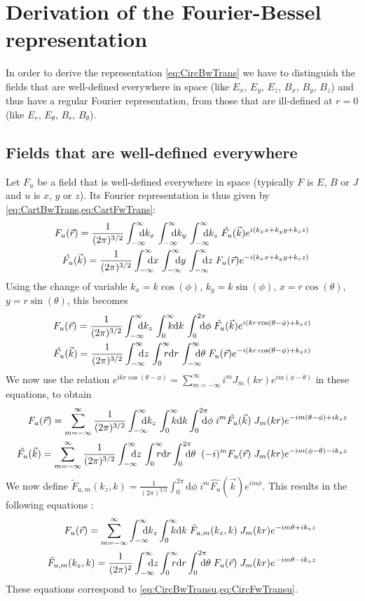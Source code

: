 
\section{Derivation of the Fourier-Bessel representation}
\label{sec:CircTrans}

In order to derive the representation \cref{eq:CircBwTrans} we have to
distinguish the fields that are well-defined everywhere in space (like
$E_x$, $E_y$, $E_z$, $B_x$, $B_y$, $B_z$) and thus have a regular
Fourier representation, from those that are ill-defined at $r=0$ (like $E_r$, $E_\theta$, $B_r$, $B_\theta$).

\subsection{Fields that are well-defined everywhere}

Let $F_u$ be a field that is well-defined everywhere in space
(typically $F$ is $E$, $B$ or $J$ and $u$ is $x$, $y$ or $z$). Its Fourier representation
is thus given by \cref{eq:CartBwTrans,eq:CartFwTrans}:
\begin{align*}
F_u(\vec{r}) = \frac{1}{(2\pi)^{3/2}}\Integ{k_x} \,\Integ{k_y}\,
\Integ{k_z} \; \hat{F_u}(\vec{k}) e^{i(k_x x + k_y y + k_z z)} \\
\hat{F_u}(\vec{k})  = \frac{1}{(2\pi)^{3/2}}\Integ{x} \,\Integ{y}\,
\Integ{z} \; F_u(\vec{r}) e^{-i(k_x x + k_y y + k_z z)} 
\end{align*}
Using the change of variable $k_x=k\cos(\phi)$, $k_y = k\sin(\phi)$,
$x=r\cos(\theta)$, $y=r\sin(\theta)$, this becomes
 \begin{align*}
F_u(\vec{r}) = \frac{1}{(2\pi)^{3/2}}\Integ{k_z} \,\RInteg{k}\,
\TInteg{\phi} \; \hat{F_u}(\vec{k})
e^{i(k r \cos(\theta-\phi) + k_z z)} \\
\hat{F_u}(\vec{k})   = \frac{1}{(2\pi)^{3/2}}\Integ{z} \,\RInteg{r}\,
\Integ{\theta} \; F_u(\vec{r}) e^{-i(k r \cos(\theta-\phi) + k_z z)} 
\end{align*}
We now use the relation $e^{ikr\cos(\theta-\phi)} =
\sum_{m=-\infty}^{\infty} i^m J_m(kr) e^{im(\phi-\theta)}$ in these equations, to obtain
\begin{align*}
F_u (\vec{r})  = \sum_{m=-\infty}^{\infty} \frac{1}{(2\pi)^{3/2}}\Integ{k_z} \,\RInteg{k}
\TInteg{\phi} \; i^m \hat{F_u}(\vec{k}) \;
J_m(kr) e^{-im(\theta-\phi) + ik_z z} \\
\hat{F_u}(\vec{k})   =  \sum_{m=-\infty}^{\infty} \frac{1}{(2\pi)^{3/2}}\Integ{z} \,\RInteg{r}
\TInteg{\theta} \;\; (-i)^m F_u(\vec{r}) \; J_m(kr) e^{-im(\phi-\theta) -ik_z z} 
\end{align*}
We now define $\tilde{F}_{u,m}(k_z,k) = \frac{1}{(2\pi)^{3/2}}\int_0^{2\pi}
\mathrm{d}\phi \; i^m \hat{F_u}(\vec{k})
e^{im\phi}$. This results in the following equations :
\begin{align*}
F_u(\vec{r}) = \sum_{m=-\infty}^{\infty} \Integ{k_z}
\RInteg{k}\; \tilde{F}_{u,m}(k_z,k) \; J_m(kr) e^{-im\theta + ik_z z} 
\\
\tilde{F}_{u,m}(k_z,k) = \frac{1}{(2\pi)^2} \Integ{z} \RInteg{r}
\TInteg{\theta} \;F_u(\vec{r})\; J_m(kr) e^{-im\theta
 - i k_z z}
\end{align*}
These equations correspond to \cref{eq:CircBwTransu,eq:CircFwTransu}.

